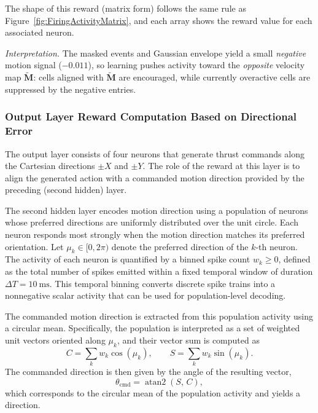 The shape of this reward (matrix form) follows the same rule as Figure~\ref{fig:FiringActivityMatrix}, and each array shows the reward value for each associated neuron. 

\emph{Interpretation.}
The masked events and Gaussian envelope yield a small \emph{negative} motion signal ($-0.011$), so learning pushes activity toward the \emph{opposite} velocity map \(\widetilde{\mathbf{M}}\): cells aligned with \(\widetilde{\mathbf{M}}\) are encouraged, while currently overactive cells are suppressed by the negative entries.

\subsubsection{Output Layer Reward Computation Based on Directional Error}


The output layer consists of four neurons that generate thrust commands along the Cartesian
directions \(\pm X\) and \(\pm Y\).
The role of the reward at this layer is to align the generated action with a commanded
motion direction provided by the preceding (second hidden) layer.

The second hidden layer encodes motion direction using a population of neurons whose
preferred directions are uniformly distributed over the unit circle.
Each neuron responds most strongly when the motion direction matches its preferred
orientation.
Let \(\mu_k \in [0,2\pi)\) denote the preferred direction of the \(k\)-th neuron.
The activity of each neuron is quantified by a binned spike count \(w_k \ge 0\), defined as
the total number of spikes emitted within a fixed temporal window of duration
\(\Delta T = 10~\mathrm{ms}\).
This temporal binning converts discrete spike trains into a nonnegative scalar activity
that can be used for population-level decoding.

The commanded motion direction is extracted from this population activity using a
circular mean.
Specifically, the population is interpreted as a set of weighted unit vectors oriented
along \(\mu_k\), and their vector sum is computed as
\begin{equation}
C = \sum_k w_k \cos(\mu_k), \qquad
S = \sum_k w_k \sin(\mu_k).
\end{equation}
The commanded direction is then given by the angle of the resulting vector,
\begin{equation}
\theta_{\mathrm{cmd}} = \operatorname{atan2}(S,\,C),
\end{equation}
which corresponds to the circular mean of the population activity and yields a direction.


